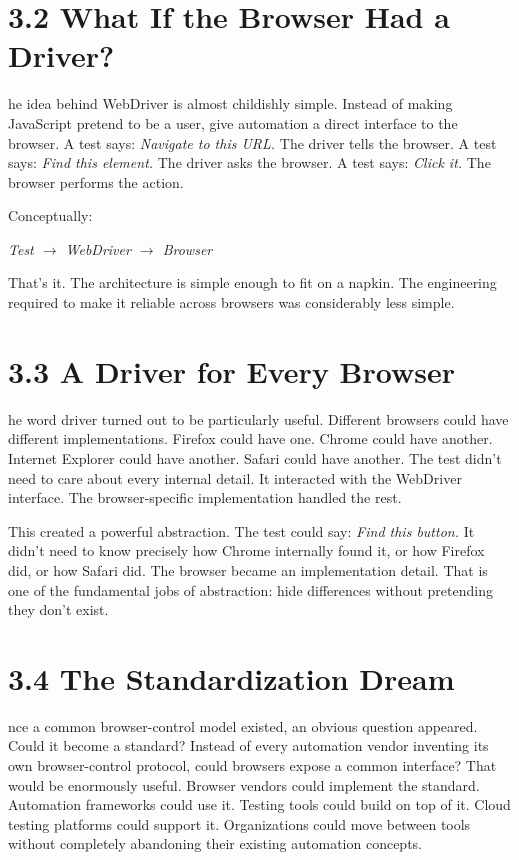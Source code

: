 \documentclass[11pt, a4paper, openany]{book}
\newcommand{\initialcap}[1]{{\fontfamily{lmss}\selectfont\huge\textbf{#1}}}
\begin{document}
\section{3.2 What If the Browser Had a Driver?}
\noindent \initialcap{T}he idea behind WebDriver is almost childishly simple. Instead of making JavaScript pretend to be a user, give automation a direct interface to the browser. A test says: \textit{Navigate to this URL.} The driver tells the browser. A test says: \textit{Find this element.} The driver asks the browser. A test says: \textit{Click it.} The browser performs the action. 

Conceptually:
\begin{center}
\textit{Test $\rightarrow$ WebDriver $\rightarrow$ Browser}
\end{center}
That's it. The architecture is simple enough to fit on a napkin. The engineering required to make it reliable across browsers was considerably less simple.

\section{3.3 A Driver for Every Browser}
\noindent \initialcap{T}he word driver turned out to be particularly useful. Different browsers could have different implementations. Firefox could have one. Chrome could have another. Internet Explorer could have another. Safari could have another. The test didn't need to care about every internal detail. It interacted with the WebDriver interface. The browser-specific implementation handled the rest.

This created a powerful abstraction. The test could say: \textit{Find this button.} It didn't need to know precisely how Chrome internally found it, or how Firefox did, or how Safari did. The browser became an implementation detail. That is one of the fundamental jobs of abstraction: hide differences without pretending they don't exist.

\section{3.4 The Standardization Dream}
\noindent \initialcap{O}nce a common browser-control model existed, an obvious question appeared. Could it become a standard? Instead of every automation vendor inventing its own browser-control protocol, could browsers expose a common interface? That would be enormously useful. Browser vendors could implement the standard. Automation frameworks could use it. Testing tools could build on top of it. Cloud testing platforms could support it. Organizations could move between tools without completely abandoning their existing automation concepts.
\end{document}
